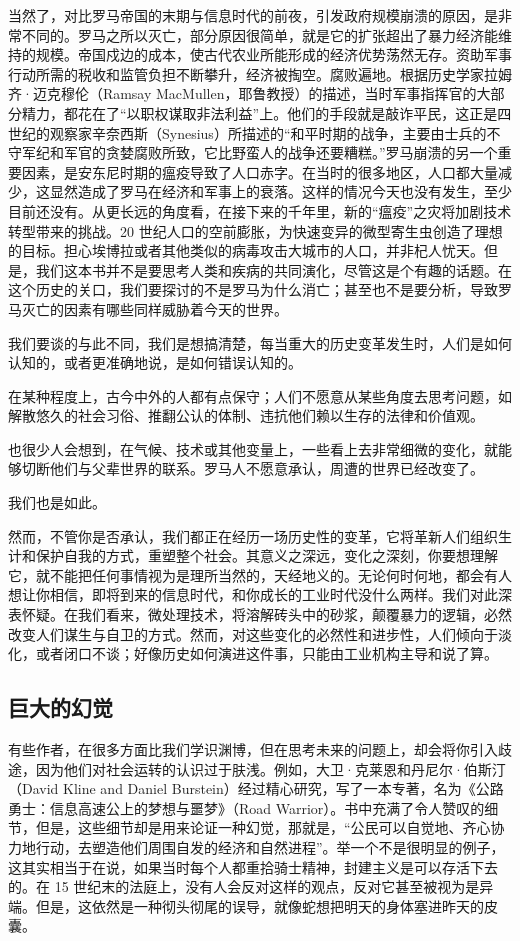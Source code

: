 当然了，对比罗马帝国的末期与信息时代的前夜，引发政府规模崩溃的原因，是非常不同的。罗马之所以灭亡，部分原因很简单，就是它的扩张超出了暴力经济能维持的规模。帝国戍边的成本，使古代农业所能形成的经济优势荡然无存。资助军事行动所需的税收和监管负担不断攀升，经济被掏空。腐败遍地。根据历史学家拉姆齐·迈克穆伦（Ramsay MacMullen，耶鲁教授）的描述，当时军事指挥官的大部分精力，都花在了“以职权谋取非法利益”上。他们的手段就是敲诈平民，这正是四世纪的观察家辛奈西斯（Synesius）所描述的“和平时期的战争，主要由士兵的不守军纪和军官的贪婪腐败所致，它比野蛮人的战争还要糟糕。”罗马崩溃的另一个重要因素，是安东尼时期的瘟疫导致了人口赤字。在当时的很多地区，人口都大量减少，这显然造成了罗马在经济和军事上的衰落。这样的情况今天也没有发生，至少目前还没有。从更长远的角度看，在接下来的千年里，新的“瘟疫”之灾将加剧技术转型带来的挑战。20 世纪人口的空前膨胀，为快速变异的微型寄生虫创造了理想的目标。担心埃博拉或者其他类似的病毒攻击大城市的人口，并非杞人忧天。但是，我们这本书并不是要思考人类和疾病的共同演化，尽管这是个有趣的话题。在这个历史的关口，我们要探讨的不是罗马为什么消亡；甚至也不是要分析，导致罗马灭亡的因素有哪些同样威胁着今天的世界。

我们要谈的与此不同，我们是想搞清楚，每当重大的历史变革发生时，人们是如何认知的，或者更准确地说，是如何错误认知的。

在某种程度上，古今中外的人都有点保守；人们不愿意从某些角度去思考问题，如解散悠久的社会习俗、推翻公认的体制、违抗他们赖以生存的法律和价值观。

也很少人会想到，在气候、技术或其他变量上，一些看上去非常细微的变化，就能够切断他们与父辈世界的联系。罗马人不愿意承认，周遭的世界已经改变了。

我们也是如此。

然而，不管你是否承认，我们都正在经历一场历史性的变革，它将革新人们组织生计和保护自我的方式，重塑整个社会。其意义之深远，变化之深刻，你要想理解它，就不能把任何事情视为是理所当然的，天经地义的。无论何时何地，都会有人想让你相信，即将到来的信息时代，和你成长的工业时代没什么两样。我们对此深表怀疑。在我们看来，微处理技术，将溶解砖头中的砂浆，颠覆暴力的逻辑，必然改变人们谋生与自卫的方式。然而，对这些变化的必然性和进步性，人们倾向于淡化，或者闭口不谈；好像历史如何演进这件事，只能由工业机构主导和说了算。

\subsection{巨大的幻觉}
有些作者，在很多方面比我们学识渊博，但在思考未来的问题上，却会将你引入歧途，因为他们对社会运转的认识过于肤浅。例如，大卫·克莱恩和丹尼尔·伯斯汀（David Kline and Daniel Burstein）经过精心研究，写了一本专著，名为《公路勇士：信息高速公上的梦想与噩梦》（Road Warrior）。书中充满了令人赞叹的细节，但是，这些细节却是用来论证一种幻觉，那就是，“公民可以自觉地、齐心协力地行动，去塑造他们周围自发的经济和自然进程”。举一个不是很明显的例子，这其实相当于在说，如果当时每个人都重拾骑士精神，封建主义是可以存活下去的。在 15 世纪末的法庭上，没有人会反对这样的观点，反对它甚至被视为是异端。但是，这依然是一种彻头彻尾的误导，就像蛇想把明天的身体塞进昨天的皮囊。

